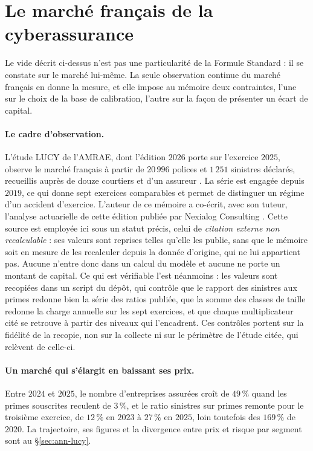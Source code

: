 \section{Le marché français de la cyberassurance}
\label{sec:lucy}

Le vide décrit ci-dessus n'est pas une particularité de la Formule Standard : il se constate sur
le marché lui-même. La seule observation continue du marché français en donne la mesure, et elle
impose au mémoire deux contraintes, l'une sur le choix de la base de calibration, l'autre sur la
façon de présenter un écart de capital.

\paragraph{Le cadre d'observation.} L'étude LUCY de l'AMRAE, dont l'édition $2026$ porte sur
l'exercice $2025$, observe le marché français à partir de $20\,996$ polices et $1\,251$ sinistres
déclarés, recueillis auprès de douze courtiers et d'un assureur \citep{amraeLucy2026}. La série
est engagée depuis $2019$, ce qui donne sept exercices comparables et permet de distinguer un
régime d'un accident d'exercice. L'auteur de ce mémoire a co-écrit, avec son tuteur, l'analyse
actuarielle de cette édition publiée par Nexialog Consulting \citep{RapiorKaddouri2026}. Cette
source est employée ici sous un statut précis, celui de \emph{citation externe non
recalculable} : ses valeurs sont reprises telles qu'elle les publie, sans que le mémoire soit en
mesure de les recalculer depuis la donnée d'origine, qui ne lui appartient pas. Aucune n'entre
donc dans un calcul du modèle et aucune ne porte un montant de capital. Ce qui est vérifiable
l'est néanmoins : les valeurs sont recopiées dans un script du dépôt, qui contrôle que le rapport
des sinistres aux primes redonne bien la série des ratios publiée, que la somme des classes de
taille redonne la charge annuelle sur les sept exercices, et que chaque multiplicateur cité se
retrouve à partir des niveaux qui l'encadrent. Ces contrôles portent sur la fidélité de la
recopie, non sur la collecte ni sur le périmètre de l'étude citée, qui relèvent de celle-ci.

\paragraph{Un marché qui s'élargit en baissant ses prix.} Entre $2024$ et $2025$, le nombre
d'entreprises assurées croît de $49\,\%$ quand les primes souscrites reculent de $3\,\%$, et le
ratio sinistres sur primes remonte pour le troisième exercice, de $12\,\%$ en $2023$ à $27\,\%$
en $2025$, loin toutefois des $169\,\%$ de $2020$. La trajectoire, ses figures et la divergence
entre prix et risque par segment sont au \S\ref{sec:ann-lucy}.

